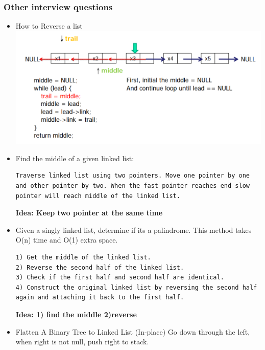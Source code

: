 \documentclass[a4paper,12pt,twoside]{book}
\begin{document}
\subsubsection{Other interview questions}
\begin{itemize}
\item How to Reverse a list
\includegraphics[scale=0.65]{pics/reverse.png} \newline

\item Find the middle of a given linked list: 
\begin{lstlisting}[breaklines]
Traverse linked list using two pointers. Move one pointer by one and other pointer by two. When the fast pointer reaches end slow pointer will reach middle of the linked list.
\end{lstlisting}
\textbf{Idea: Keep two pointer at the same time}

\item Given a singly linked list, determine if its a palindrome. This method takes O(n) time and O(1) extra space.
\begin{lstlisting}[breaklines]
1) Get the middle of the linked list.
2) Reverse the second half of the linked list.
3) Check if the first half and second half are identical.
4) Construct the original linked list by reversing the second half again and attaching it back to the first half.
\end{lstlisting}
\textbf{Idea: 1) find the middle 2)reverse}

\item Flatten A Binary Tree to Linked List (In-place) 
Go down through the left, when right is not null, push right to stack. \newline


\end{itemize}
\end{document}
